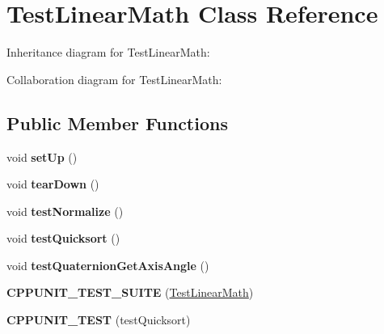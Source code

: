 \hypertarget{class_test_linear_math}{\section{Test\+Linear\+Math Class Reference}
\label{class_test_linear_math}
}


Inheritance diagram for Test\+Linear\+Math\+:


Collaboration diagram for Test\+Linear\+Math\+:
\subsection*{Public Member Functions}
\begin{DoxyCompactItemize}
\item 
\hypertarget{class_test_linear_math_a01e713b3ba66bd1321ba07de3381a167}{void {\bfseries set\+Up} ()}\label{class_test_linear_math_a01e713b3ba66bd1321ba07de3381a167}

\item 
\hypertarget{class_test_linear_math_a8ff4273cb863bd0c58a22678b6b33b8e}{void {\bfseries tear\+Down} ()}\label{class_test_linear_math_a8ff4273cb863bd0c58a22678b6b33b8e}

\item 
\hypertarget{class_test_linear_math_af4e40d2e35fae45e18c5cc9a57399ea4}{void {\bfseries test\+Normalize} ()}\label{class_test_linear_math_af4e40d2e35fae45e18c5cc9a57399ea4}

\item 
\hypertarget{class_test_linear_math_a3daf76bd95d44fea55bf5663495bd32f}{void {\bfseries test\+Quicksort} ()}\label{class_test_linear_math_a3daf76bd95d44fea55bf5663495bd32f}

\item 
\hypertarget{class_test_linear_math_aaa7af63fb8e1ad9d330ec17c49adf6b4}{void {\bfseries test\+Quaternion\+Get\+Axis\+Angle} ()}\label{class_test_linear_math_aaa7af63fb8e1ad9d330ec17c49adf6b4}

\item 
\hypertarget{class_test_linear_math_a41b20adde5881a0e11b4344203b08586}{{\bfseries C\+P\+P\+U\+N\+I\+T\+\_\+\+T\+E\+S\+T\+\_\+\+S\+U\+I\+T\+E} (\hyperlink{class_test_linear_math}{Test\+Linear\+Math})}\label{class_test_linear_math_a41b20adde5881a0e11b4344203b08586}

\item 
\hypertarget{class_test_linear_math_aec3fe3d6d1e4b7d16ff43265f31b98e9}{{\bfseries C\+P\+P\+U\+N\+I\+T\+\_\+\+T\+E\+S\+T} (test\+Quicksort)}\label{class_test_linear_math_aec3fe3d6d1e4b7d16ff43265f31b98e9}


\end{DoxyCompactItemize}
